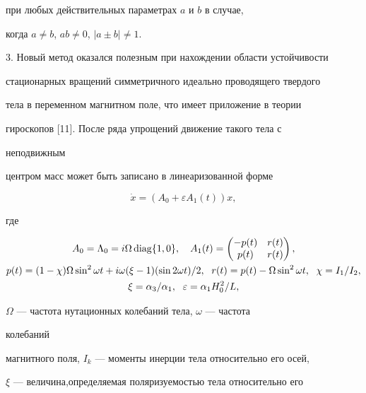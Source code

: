 при любых действительных параметрах $a$ и $b$ в случае, 


когда $a\ne b$, $a b\ne0$, $|a\pm b|\ne1$. 


 


3. Новый метод оказался полезным при нахождении области устойчивости  


стационарных вращений симметричного идеально проводящего твердого  


тела в переменном магнитном поле, что имеет приложение в теории 


гироскопов [11]. После ряда упрощений движение такого тела с 


неподвижным 


центром масс может быть записано в линеаризованной форме 


\begin{equation} 


\Dot x=(A_0+\varepsilon A_1(t))x, 


\end{equation} 


где 


\begin{gather*} 


A_0=\Lambda_0=i\Omega\diag\{1,0\},\quad 


A_1(t)=\begin{pmatrix} 


-p(t) & r(t) \\ p(t) & r(t) 


\end{pmatrix} 


,\\ 


p(t)=(1-\chi)\Omega\sin^2\omega t+i\omega(\xi-1)(\sin2\omega t)/2, 


\ \; r(t)=p(t)-\Omega\sin^2\omega t,\ \; \chi=I_1/I_2, \\


\xi=\alpha_3/\alpha_1,\ \; \varepsilon=\alpha_1H^2_0/L, 


\end{gather*} 


$\Omega$ --- частота нутационных колебаний тела, $\omega$ --- частота 


колебаний  


магнитного поля, $I_k$ --- моменты инерции тела относительно его осей,  


$\xi$ --- величина,определяемая поляризуемостью тела относительно его 


